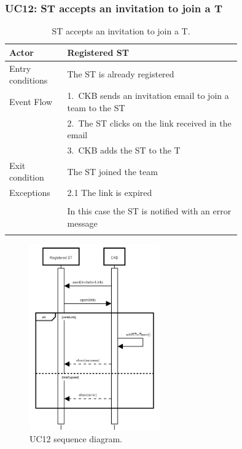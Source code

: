 \subsubsection*{UC12: ST accepts an invitation to join a T}
\begin{center}
  \begin{longtable}{l|p{0.75\linewidth}}
    \hline
    Actor & Registered ST \\
    \hline
    Entry conditions & The ST is already registered \\
    \hline
    Event Flow & 1.\ CKB sends an invitation email to join a team to the ST \\
    & 2.\ The ST clicks on the link received in the email \\
    & 3.\ CKB adds the ST to the T \\
    \hline
    Exit condition &  The ST joined the team \\
    \hline
    Exceptions & 2.1 The link is expired \\ \\
    & In this case the ST is notified with an error message \\
    \hline
    \caption{ST accepts an invitation to join a T.}
    \label{tab: ST_accepts_invitation}
  \end{longtable}

  \begin{figure} [H]
    \begin{center}
        \includegraphics[width=0.50\textwidth,height=\textheight,keepaspectratio]{Images/SequenceDiagrams/UC12.png}
        \caption{UC12 sequence diagram.}
        \label{fig: UC12_sequence_diagram}
    \end{center}
  \end{figure}
\end{center}

